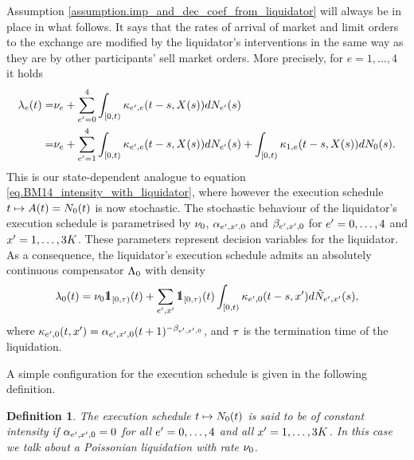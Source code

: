 \documentclass[10pt]{article}
\newtheorem{defi}[thm]{Definition}
\begin{document}
Assumption \ref{assumption.imp_and_dec_coef_from_liquidator} will always be in place in what follows. It says that the rates of arrival of market and limit orders to the exchange are modified by the liquidator's interventions in the same way as they are by other participants' sell market orders. More precisely, for $e=1,\dots,4$ it holds 
\begin{equation}\label{eq.intensities_when_liquidator_is_present}
\begin{split}
\intensity[e](t) =& \baseRate_e 
 + \sum_{\eone = 0}^{4}\int_{[0,t)} \hawkesKernel_{\eone,e}(t-s,\stateVariable(s))d\countingProc[\eone](s)
 \\
 =& \baseRate_e 
 + \sum_{\eone = 1}^{4}\int_{[0,t)} \hawkesKernel_{\eone,e}(t-s,\stateVariable(s))d\countingProc[\eone](s)
 + \int_{[0,t)} \hawkesKernel_{1,e}(t-s,\stateVariable(s))d\countingProc[0](s).
 \end{split}
\end{equation}
This is our state-dependent analogue to equation \eqref{eq.BM14_intensity_with_liquidator}, where however the execution schedule $t \mapsto A(t)=\countingProc[0](t)$ is now stochastic. The stochastic behaviour of the liquidator's execution schedule is parametrised by $\baseRate_0$, $\impCoef_{\eone,\xone,0}$ and $\decCoef_{\eone,\xone,0}$ for $\eone = 0,\dots,4$ and $\xone=1,\dots,3K$. These parameters represent decision variables for the liquidator. As a consequence, the liquidator's execution schedule admits an absolutely continuous compensator $\compensator_{0}$ with density 
\begin{equation}\label{eq.intensity_of_liquidator}
 \intensity[0](t)
 =
 \baseRate_0 \one_{[0,\terminationTime)}(t) + 
 \sum_{\eone,\xone}\one_{[0,\terminationTime)}(t)
 \int_{[0,t)} \hawkesKernel_{\eone,0} (t-s,\xone) d\hybridHawkes_{\eone,\xone}(s),
\end{equation}
where $\hawkesKernel_{\eone,0}(t,\xone) = \impCoef_{\eone,\xone,0}(t+1)^{-\decCoef_{\eone,\xone,0}}$, and $\terminationTime$ is the termination time of the liquidation. 

A simple configuration for the execution schedule is given in the following definition. 
\begin{defi}\label{def.poissonina_liquidation}
The execution schedule $t \mapsto \countingProc[0](t)$ is said to be of constant intensity if $\impCoef_{\eone,\xone,0} = 0$ for all $\eone = 0,\dots,4$ and all $\xone=1,\dots,3K$. In this case we talk about a Poissonian liquidation with rate $\baseRate_0$. 
\end{defi}
\end{document}
